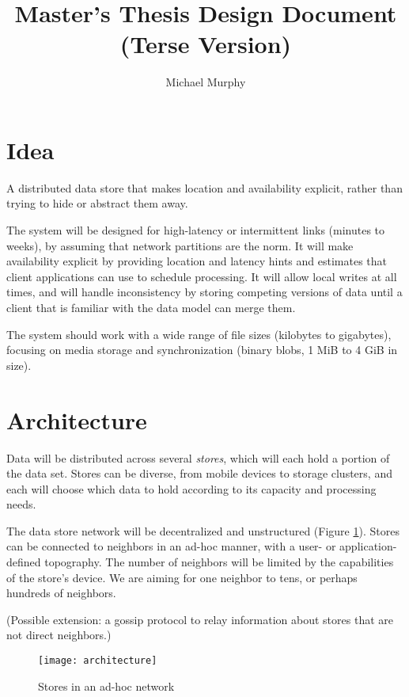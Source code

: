 \documentclass[a4paper]{article}
\newcommand{\newterm}{\textit}
\begin{document}
\title{Master's Thesis Design Document \\ (Terse Version)}
\author{Michael Murphy}
\maketitle

\section{Idea}\label{idea}

A distributed data store that makes location and availability explicit, rather
than trying to hide or abstract them away.

The system will be designed for high-latency or intermittent links (minutes to
weeks), by assuming that network partitions are the norm. It will make
availability explicit by providing location and latency hints and estimates that
client applications can use to schedule processing. It will allow local writes
at all times, and will handle inconsistency by storing competing versions of
data until a client that is familiar with the data model can merge them.

The system should work with a wide range of file sizes (kilobytes to gigabytes),
focusing on media storage and synchronization (binary blobs, 1 MiB to 4 GiB in
size).


\section{Architecture}\label{architecture}

Data will be distributed across several \newterm{stores}, which will each hold a
portion of the data set. Stores can be diverse, from mobile devices to storage
clusters, and each will choose which data to hold according to its capacity and
processing needs.

The data store network will be decentralized and unstructured (Figure
\ref{fig:architecture}). Stores can be connected to neighbors in an ad-hoc
manner, with a user- or application-defined topography. The number of neighbors
will be limited by the capabilities of the store's device. We are aiming for one
neighbor to tens, or perhaps hundreds of neighbors.

(Possible extension: a gossip protocol to relay information about stores that
are not direct neighbors.)

\begin{figure}[h]
  \caption{Stores in an ad-hoc network}
  \label{fig:architecture}
  \centering
    \texttt{[image: architecture]}
\end{figure}
\end{document}
